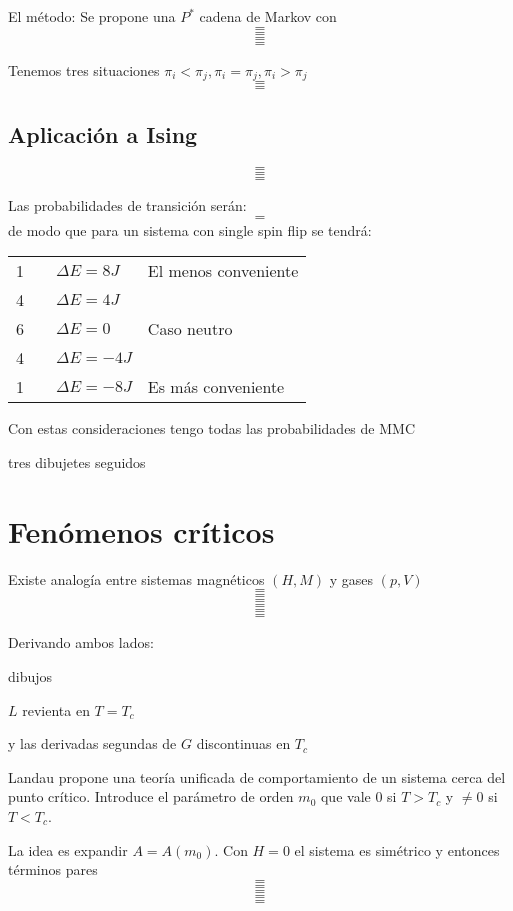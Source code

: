 \documentclass[10pt,oneside]{CBFT_book}
\begin{document}
El método:
Se propone una $P^*$ cadena de Markov con 
\[=\]
\[=\]
\[=\]
\[=\]

Tenemos tres situaciones $ \pi_i < \pi_j , \pi_i = \pi_j, \pi_i > \pi_j$
\[=\]
\[=\]

\subsection{Aplicación a Ising}

\[=\]
\[=\]
\[=\]

Las probabilidades de transición serán:
\[=\]
de modo que para un sistema con single spin flip se tendrá:
\begin{center}
\begin{tabular}{llll}
1 &  & $ \Delta E = 8J $  & El menos conveniente \\
4 &  & $ \Delta E = 4J $ &  \\
6 &  & $ \Delta E = 0 $ & Caso neutro \\
4 &  & $ \Delta E = -4J $ &  \\
1 &  & $ \Delta E = -8J $ & Es más conveniente
\end{tabular}
\end{center}

Con estas consideraciones tengo todas las probabilidades de MMC

tres dibujetes seguidos

\section{Fenómenos críticos}

Existe analogía entre sistemas magnéticos $(H,M)$ y gases $(p,V)$
\[=\]
\[=\]
\[=\]
\[=\]
\[=\]
\[=\]

Derivando ambos lados:

dibujos

$L$ revienta en $T=T_c$

y las derivadas segundas de $G$ discontinuas en $T_c$

Landau propone una teoría unificada de comportamiento de un sistema cerca del punto crítico.
Introduce el parámetro de orden $m_0$ que vale 0 si $T>T_c$ y $\neq 0$ si $T<T_c$.

La idea es expandir $ A = A(m_0) $.
Con $H=0$ el sistema es simétrico y entonces términos pares
\[=\]
\[=\]
\[=\]
\[=\]
\[=\]
\end{document}
